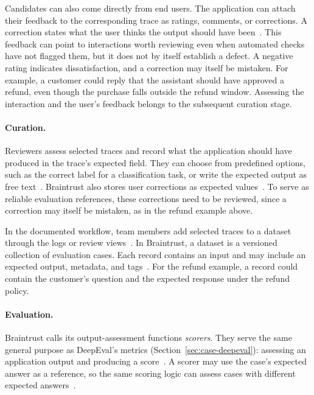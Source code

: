 Candidates can also come directly from end users. The application can attach
their feedback to the corresponding trace as ratings, comments, or
corrections. A correction states what the user thinks the output should have
been~\parencite{Braintrust:UserFeedback}. This feedback can point to
interactions worth reviewing even when automated checks have not flagged them,
but it does not by itself establish a defect. A negative rating indicates
dissatisfaction, and a correction may itself be mistaken. For example, a
customer could reply that the assistant should have approved a refund, even
though the purchase falls outside the refund window. Assessing the
interaction and the user's feedback belongs to the subsequent curation stage.

\paragraph{Curation.}
Reviewers assess selected traces and record what the application should have
produced in the trace's expected field. They can choose from predefined
options, such as the correct label for a classification task, or write the
expected output as free text~\parencite{Braintrust:HumanReview}. Braintrust
also stores user corrections as expected values~\parencite{Braintrust:UserFeedback}.
To serve as reliable evaluation references, these corrections need to be
reviewed, since a correction may itself be mistaken, as in the refund example
above.

In the documented workflow, team members add selected traces to a dataset
through the logs or review views~\parencite{Braintrust:Datasets}. In
Braintrust, a dataset is a versioned collection of evaluation cases. Each
record contains an input and may include an expected output, metadata, and
tags~\parencite{Braintrust:DatasetOverview}. For the refund example, a record
could contain the customer's question and the expected response under the
refund policy.

\paragraph{Evaluation.}
Braintrust calls its output-assessment functions \emph{scorers}. They serve
the same general purpose as DeepEval's metrics
(Section~\ref{sec:case-deepeval}): assessing an application output and
producing a score~\parencite{Braintrust:Scorers}. A scorer may use the case's
expected answer as a reference, so the same scoring logic can assess cases
with different expected answers~\parencite{Braintrust:DatasetUse}.

